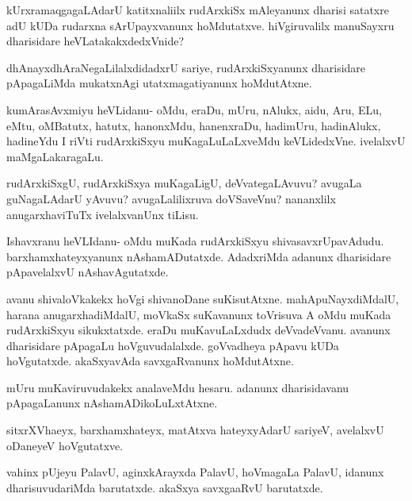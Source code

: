 \documentclass{article}
\begin{document}
\begin{mng}%
kUrxramaqgagaLAdarU katitxnaliilx rudArxkiSx mAleyanunx dharisi 
satatxre adU kUDa rudarxna sArUpayxvanunx hoMdutatxve. hiVgiruvalilx 
manuSayxru dharisidare heVLatakakxdedxVnide? 
\end{mng}

\begin{mng}%
dhAnayxdhAraNegaLilalxdidadxrU sariye, rudArxkiSxyanunx dharisidare 
pApagaLiMda mukatxnAgi utatxmagatiyanunx hoMdutAtxne.
\end{mng}

\begin{mng}%
kumArasAvxmiyu heVLidanu- oMdu, eraDu, mUru, nAlukx, aidu, Aru, ELu, 
eMtu, oMBatutx, hatutx, hanonxMdu, hanenxraDu, hadimUru, hadinAlukx, 
hadineYdu I riVti rudArxkiSxyu muKagaLuLaLxveMdu keVLidedxVne. 
ivelalxvU maMgaLakaragaLu.
\end{mng}

\begin{mng}%
rudArxkiSxgU, rudArxkiSxya muKagaLigU, deVvategaLAvuvu? avugaLa 
guNagaLAdarU yAvuvu? avugaLalilixruva doVSaveVnu? nananxlilx 
anugarxhaviTuTx ivelalxvanUnx tiLisu.
\end{mng}

\begin{mng}%
Ishavxranu heVLIdanu- oMdu muKada rudArxkiSxyu shivasavxrUpavAdudu. 
barxhamxhateyxyanunx nAshamADutatxde. AdadxriMda adanunx dharisidare 
pApavelalxvU nAshavAgutatxde.
\end{mng}

\begin{mng}%
avanu shivaloVkakekx hoVgi shivanoDane suKisutAtxne. 
mahApuNayxdiMdalU, harana anugarxhadiMdalU, moVkaSx suKavanunx 
toVrisuva A oMdu muKada rudArxkiSxyu sikukxtatxde. eraDu 
muKavuLaLxdudx deVvadeVvanu. avanunx dharisidare pApagaLu 
hoVguvudalalxde. goVvadheya pApavu kUDa hoVgutatxde. akaSxyavAda 
savxgaRvanunx hoMdutAtxne.
\end{mng}

\begin{mng}%
mUru muKaviruvudakekx analaveMdu hesaru. adanunx dharisidavanu 
pApagaLanunx nAshamADikoLuLxtAtxne.
\end{mng}

\begin{mng}%
sitxrXVhaeyx, barxhamxhateyx, matAtxva hateyxyAdarU sariyeV, avelalxvU 
oDaneyeV hoVgutatxve.
\end{mng}

\begin{mng}%
vahinx pUjeyu PalavU, aginxkArayxda PalavU, hoVmagaLa PalavU, idanunx 
dharisuvudariMda barutatxde. akaSxya savxgaaRvU barutatxde.
\end{mng}
\end{document}
